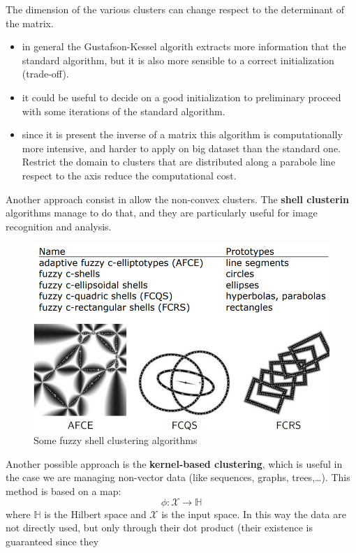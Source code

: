 \documentclass{article}
\begin{document}
The dimension of the various clusters can change respect to the determinant of the matrix.
\begin{itemize}
    \item in general the Gustafson-Kessel algorith extracts more information that the standard
          algorithm, but it is also more sensible to a correct initialization (trade-off).
    \item it could be useful to decide on a good initialization to preliminary
          proceed with some iterations of the standard algorithm.
    \item since it is present the inverse of a matrix this algorithm is computationally
          more intensive, and harder to apply on big dataset than the standard one. Restrict the domain
          to clusters that are distributed along a parabole line respect to the axis reduce the computational
          cost.
\end{itemize}
Another approach consist in allow the non-convex clusters. The \textbf{shell clusterin} algorithms
manage to do that, and they are particularly useful for image recognition and analysis.
\begin{figure}[H]
    \centering
    \includegraphics[scale=0.5]{images/fuzzy_clust_alg.png}
    \caption{Some fuzzy shell clustering algorithms}
\end{figure}
Another possible approach is the \textbf{kernel-based clustering}, which is useful in the case we
are managing non-vector data (like sequences, graphs, trees,\dots). This method is based on a map:
$$\phi:\mathcal{X}\rightarrow\mathbb{H}$$
where $\mathbb{H}$ is the Hilbert space and $\mathcal{X}$ is the input space. In this way the data are not
directly used, but only through their dot product (their existence is guaranteed since they
\end{document}
